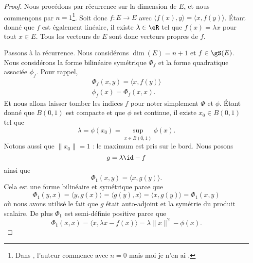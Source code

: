 \begin{proof}
    Nous procédons par récurrence sur la dimension de \( E\), et nous commençons par \( n=1\)\footnote{Dans \cite{KXjFWKA}, l'auteur commence avec \( n=0\) mais moi je n'en ai .}. Soit donc \( f\colon E\to E\) avec \( \langle f(x), y\rangle =\langle x, f(y)\rangle \). Étant donné que \( f\) est également linéaire, il existe \( \lambda\in \eR\) tel que \( f(x)=\lambda x\) pour tout \( x\in E\). Tous les vecteurs de \( E\) sont donc vecteurs propres de \( f\).

    Passons à la récurrence. Nous considérons \( \dim(E)=n+1\) et \( f\in\gS(E)\). Nous considérons la forme bilinéaire symétrique \( \Phi_f\) et la forme quadratique associée \( \phi_f\). Pour rappel,
    \begin{subequations}
        \begin{align}
        \Phi_f(x,y)=\langle x, f(y)\rangle \\
        \phi_f(x)=\Phi_f(x,x).
        \end{align}
    \end{subequations}
    Et nous allons laisser tomber les indices \( f\) pour noter simplement \( \Phi\) et \( \phi\). Étant donné que \( \overline{ B(0,1) }\) est compacte et que \( \phi\) est continue, il existe \( x_0\in\overline{ B(0,1) }\) tel que
    \begin{equation}
        \lambda=\phi(x_0)=\sup_{x\in\overline{ B(0,1) }}\phi(x).
    \end{equation}
    Notons aussi que \( \| x_0 \|=1\) : le maximum est pris sur le bord. Nous posons
    \begin{equation}
        g=\lambda\id-f
    \end{equation}
    ainsi que
    \begin{equation}
        \Phi_1(x,y)=\langle x, g(y)\rangle .
    \end{equation}
    Cela est une forme bilinéaire et symétrique parce que
    \begin{equation}
        \Phi_1(y,x)=\langle y, g(x)\rangle =\langle g(y), x\rangle =\langle x, g(y)\rangle =\Phi_1(x,y)
    \end{equation}
    où nous avons utilisé le fait que \( g\) était auto-adjoint et la symétrie du produit scalaire. De plus \( \Phi_1\) est semi-définie positive parce que
    \begin{equation}
        \Phi_1(x,x)=\langle x, \lambda x-f(x)\rangle =\lambda\| x \|^2-\phi(x).
    \end{equation}

\end{proof}
